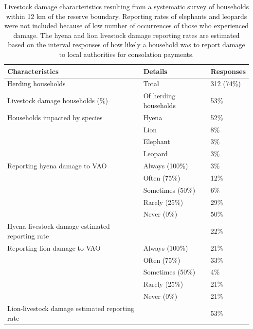 \documentclass[12pt,]{article}
\begin{document}
\begin{table}[]
\centering
\footnotesize
\caption{Livestock damage characteristics resulting from a systematic survey of households within 12 km of the reserve boundary. Reporting rates of elephants and leopards were not included because of low number of occurrences of those who experienced damage. The hyena and lion livestock damage reporting rates are estimated based on the interval responses of how likely a household was to report damage to local authorities for consolation payments.}

\begin{tabular}{lll}
\hline
\textbf{Characteristics}                        & \textbf{Details}      & \textbf{Responses} \\ \hline
Herding households                              & Total                 & 312 (74\%)         \\
Livestock damage households (\%)                & Of herding households & 53\%               \\
Households impacted by species                  & Hyena                 & 52\%               \\
                                                & Lion                  & 8\%                \\
                                                & Elephant              & 3\%                \\
                                                & Leopard               & 3\%                \\
Reporting hyena damage to VAO                   & Always (100\%)        & 3\%                \\
                                                & Often (75\%)          & 12\%               \\
                                                & Sometimes (50\%)      & 6\%                \\
                                                & Rarely (25\%)         & 29\%               \\
                                                & Never (0\%)           & 50\%               \\
Hyena-livestock damage estimated reporting rate &                       & 22\%               \\
Reporting lion damage to VAO                    & Always (100\%)        & 21\%               \\
                                                & Often (75\%)          & 33\%               \\
                                                & Sometimes (50\%)      & 4\%                \\
                                                & Rarely (25\%)         & 21\%               \\
                                                & Never (0\%)           & 21\%               \\
Lion-livestock damage estimated reporting rate  &                       & 53\%               \\ \hline
\end{tabular}


\end{table}
\end{document}
